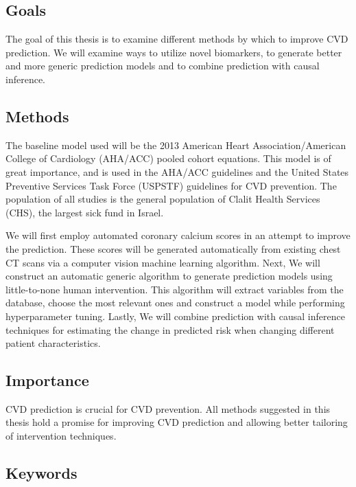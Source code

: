 \documentclass[a4paper,12pt]{article}
\begin{document}
		\subsection{Goals}
		
		The goal of this thesis is to examine different methods by which to improve CVD prediction. We will examine ways to utilize novel biomarkers, to generate better and more generic prediction models and to combine prediction with causal inference.
		
		\subsection{Methods}
		
		The baseline model used will be the 2013 American Heart Association/American College of Cardiology (AHA/ACC) pooled cohort equations\cite{Goff2014}. This model is of great importance, and is used in the AHA/ACC guidelines and the United States Preventive Services Task Force (USPSTF) guidelines for CVD prevention\cite{Bibbins-Domingo2016}. The population of all studies is the general population of Clalit Health Services (CHS), the largest sick fund in Israel.
		
		We will first employ automated coronary calcium scores in an attempt to improve the prediction. These scores will be generated automatically from existing chest CT scans via a computer vision machine learning algorithm. Next, We will construct an automatic generic algorithm to generate prediction models using little-to-none human intervention. This algorithm will extract variables from the database, choose the most relevant ones and construct a model while performing hyperparameter tuning. Lastly, We will combine prediction with causal inference techniques for estimating the change in predicted risk when changing different patient characteristics.
		
		\subsection{Importance}
		
		CVD prediction is crucial for CVD prevention. All methods suggested in this thesis hold a promise for improving CVD prediction and allowing better tailoring of intervention techniques.
		
		\subsection{Keywords}
		
\end{document}
